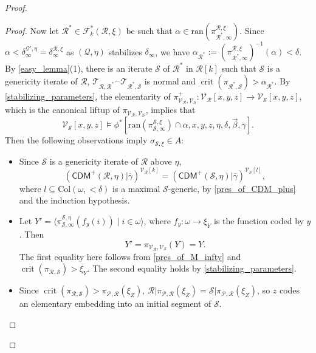 \documentclass{amsart}
\renewcommand{\subset}{\subseteq}
\DeclareMathOperator{\crit}{crit}
\begin{document}
\begin{proof}
\begin{proof}
    Now let $\mathcal{R}^*\in\mathcal{F}^*_k(\mathcal{R}, \xi)$ be such that $\alpha\in\mathrm{ran}(\pi^{\mathcal{R}, \xi}_{\mathcal{R}^*, \infty})$.
    Since $\alpha<\delta^{\mathcal{Q}', \eta}_{\infty}=\delta^{\mathcal{R}, \xi}_{\infty}$ as $(\mathcal{Q}, \eta)$ stabilizes $\delta_{\infty}$, we have $\alpha_{\mathcal{R}^*}:=(\pi^{\mathcal{R}, \xi}_{\mathcal{R}^*, \infty})^{-1}(\alpha)<\delta$.
    By \cref{easy_lemma}(1), there is an iterate $\mathcal{S}$ of $\mathcal{R}^*$ in $\mathcal{R}[k]$ such that $\mathcal{S}$ is a genericity iterate of $\mathcal{R}$, $\mathcal{T}_{\mathcal{R}, \mathcal{R}^*}{}^{\frown}\mathcal{T}_{\mathcal{R}^*, \mathcal{S}}$ is normal and $\crit(\pi_{\mathcal{R}^*, \mathcal{S}})>\alpha_{\mathcal{R}^*}$.
    By \cref{stabilizing_parameters}, the elementarity of $\pi^+_{\mathcal{V}_{\mathcal{R}}, \mathcal{V}_{\mathcal{S}}}\colon\mathcal{V}_{\mathcal{R}}[x, y, z]\to\mathcal{V}_{\mathcal{S}}[x, y, z]$, which is the canonical liftup of $\pi_{\mathcal{V}_{\mathcal{R}}, \mathcal{V}_{\mathcal{S}}}$, implies that
    \[
    \mathcal{V}_{\mathcal{S}}[x, y, z]\models\phi^*[\mathrm{ran}(\pi^{\mathcal{S}, \xi}_{\mathcal{S}, \infty})\cap\alpha, x, y, z, \eta, \delta, \vec{\beta}, \overline{\gamma}].
    \]
    Then the following observations imply $\sigma_{\mathcal{S}, \xi}\in A$:
    \begin{itemize}
        \item Since $\mathcal{S}$ is a genericity iterate of $\mathcal{R}$ above $\eta$,
        \[
        (\mathsf{CDM}^{+}(\mathcal{R}, \eta)\vert\overline{\gamma})^{\mathcal{V}_{\mathcal{R}}[k]}=(\mathsf{CDM}^{+}(\mathcal{S}, \eta)\vert\overline{\gamma})^{\mathcal{V}_{\mathcal{S}}[l]},
        \]
        where $l\subset\mathrm{Col}(\omega, {<}\delta)$ is a maximal $\mathcal{S}$-generic, by \cref{pres_of_CDM_plus} and the induction hypothesis.
        \item Let $Y'=\langle\pi^{\mathcal{S}, \eta}_{\mathcal{S}, \infty}(f_y(i))\mid i\in\omega\rangle$, where $f_y\colon\omega\to\xi_Y$ is the function coded by $y$.
        Then
        \[
        Y'=\pi_{\mathcal{V}_{\mathcal{R}}, \mathcal{V}_{\mathcal{S}}}(Y)=Y.
        \]
        The first equality here follows from \cref{pres_of_M_infty} and $\crit(\pi_{\mathcal{R}, \mathcal{S}})>\xi_Y$.
        The second equality holds by \cref{stabilizing_parameters}.
        \item Since $\crit(\pi_{\mathcal{R}, \mathcal{S}})>\pi_{\mathcal{P}, \mathcal{R}}(\xi_Z)$, $\mathcal{R}\vert\pi_{\mathcal{P}, \mathcal{R}}(\xi_Z)=\mathcal{S}\vert\pi_{\mathcal{P}, \mathcal{R}}(\xi_Z)$, so $z$ codes an elementary embedding into an initial segment of $\mathcal{S}$.

\end{itemize}
\end{proof}
\end{proof}
\end{document}
